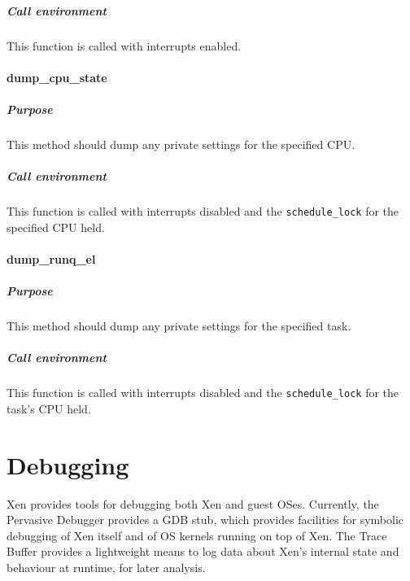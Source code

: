 \documentclass[11pt,twoside,final,openright]{xenstyle}
\begin{document}
\paragraph*{Call environment}

This function is called with interrupts enabled.

\subsubsection{dump\_cpu\_state}

\paragraph*{Purpose}

This method should dump any private settings for the specified CPU.

\paragraph*{Call environment}

This function is called with interrupts disabled and the {\tt schedule\_lock}
for the specified CPU held.

\subsubsection{dump\_runq\_el}

\paragraph*{Purpose}

This method should dump any private settings for the specified task.

\paragraph*{Call environment}

This function is called with interrupts disabled and the {\tt schedule\_lock}
for the task's CPU held.


\chapter{Debugging}

Xen provides tools for debugging both Xen and guest OSes.  Currently, the
Pervasive Debugger provides a GDB stub, which provides facilities for symbolic
debugging of Xen itself and of OS kernels running on top of Xen.  The Trace
Buffer provides a lightweight means to log data about Xen's internal state and
behaviour at runtime, for later analysis.
\end{document}
